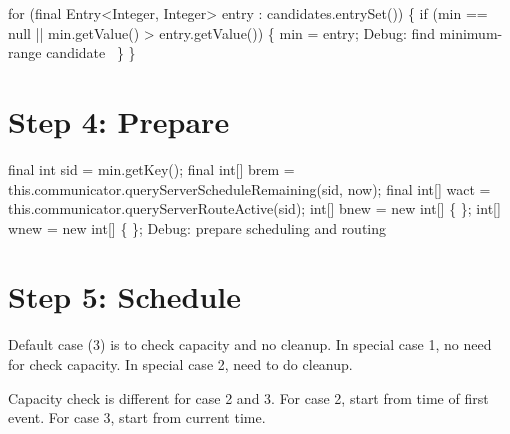 \nwenddocs{}\endmoddef\nwstartdeflinemarkup{}\nwenddeflinemarkup
for (final Entry<Integer, Integer> entry : candidates.entrySet()) \{
  if (min == null || min.getValue() > entry.getValue()) \{
    min = entry;
    \LA{}Debug: find minimum-range candidate~{\nwtagstyle{}}\RA{}
  \}
\}
\nwendcode{}\nwdocspar

\section{Step 4: Prepare}

\nwenddocs{}\endmoddef\nwstartdeflinemarkup{}\nwenddeflinemarkup
final int sid = min.getKey();
final int[] brem = this.communicator.queryServerScheduleRemaining(sid, now);
final int[] wact = this.communicator.queryServerRouteActive(sid);
int[] bnew = new int[] \{ \};
int[] wnew = new int[] \{ \};
\LA{}Debug: prepare scheduling and routing~{\nwtagstyle{}}\RA{}
\nwendcode{}\nwdocspar

\section{Step 5: Schedule}

Default case (3) is to check capacity and no cleanup. In special case 1,
no need for check capacity. In special case 2, need to do cleanup.

Capacity check is different for case 2 and 3. For case 2, start from time of
first event. For case 3, start from current time.

